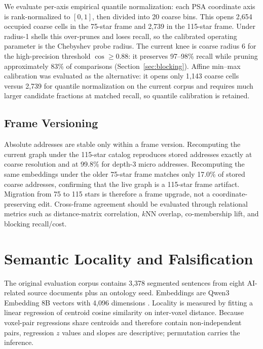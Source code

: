 \documentclass[11pt]{article}
\begin{document}
We evaluate per-axis empirical quantile normalization: each PSA coordinate axis is rank-normalized to $[0,1]$, then divided into 20 coarse bins. This opens 2,654 occupied coarse cells in the 75-star frame and 2,739 in the 115-star frame. Under radius-1 shells this over-prunes and loses recall, so the calibrated operating parameter is the Chebyshev probe radius. The current knee is coarse radius 6 for the high-precision threshold $\cos\geq0.88$: it preserves 97--98\% recall while pruning approximately 83\% of comparisons (Section~\ref{sec:blocking}). Affine min--max calibration was evaluated as the alternative: it opens only 1{,}143 coarse cells versus 2{,}739 for quantile normalization on the current corpus and requires much larger candidate fractions at matched recall, so quantile calibration is retained.

\subsection{Frame Versioning}
\label{sec:frame-versioning}

Absolute addresses are stable only within a frame version. Recomputing the current graph under the 115-star catalog reproduces stored addresses exactly at coarse resolution and at 99.8\% for depth-3 micro addresses. Recomputing the same embeddings under the older 75-star frame matches only 17.0\% of stored coarse addresses, confirming that the live graph is a 115-star frame artifact. Migration from 75 to 115 stars is therefore a frame upgrade, not a coordinate-preserving edit. Cross-frame agreement should be evaluated through relational metrics such as distance-matrix correlation, $k$NN overlap, co-membership lift, and blocking recall/cost.

\section{Semantic Locality and Falsification}
\label{sec:locality}

The original evaluation corpus contains 3,378 segmented sentences from eight AI-related source documents plus an ontology seed. Embeddings are Qwen3 Embedding 8B vectors with 4,096 dimensions \citep{zhang2025qwen3embedding}. Locality is measured by fitting a linear regression of centroid cosine similarity on inter-voxel distance. Because voxel-pair regressions share centroids and therefore contain non-independent pairs, regression $z$ values and slopes are descriptive; permutation carries the inference.
\end{document}
